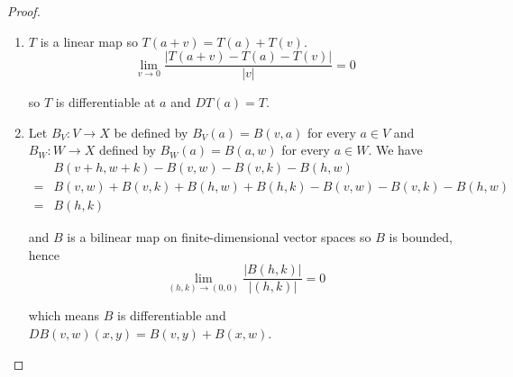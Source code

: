 \begin{proof}
\begin{enumerate}[itemsep=0pt,label={(\alph*)}]
              Since
              \begingroup
              \allowdisplaybreaks%
              \begin{align*}
                   & \lim\limits_{v \to 0} \dfrac{\left\vert R_{f}(v)/g(a + v) \right\vert}{\left\vert v \right\vert} = 0,                                                                      \\
                   & \lim\limits_{v \to 0} \dfrac{\left\vert \left(\dfrac{1}{g(a + v)} - \dfrac{1}{g(a)}\right) Df(a)v\right\vert}{\left\vert v \right\vert} = 0,                               \\
                   & \lim\limits_{v\to 0} \dfrac{\left\vert f(a)\left( \dfrac{R_{g}(v) - Dg(a)v}{g(a + v)g(a)} + \dfrac{Dg(a)}{{g(a)}^{2}}v \right) \right\vert}{\left\vert v \right\vert} = 0,
              \end{align*}
              \endgroup

              then according to the squeeze theorem
              \[
                  \lim\limits_{v \to 0} \dfrac{\left\vert \dfrac{f(a + v)}{g(a + v)} - \dfrac{f(a)}{g(a)} - \dfrac{g(a)Df(a) - f(a)Dg(a)}{{g(a)}^{2}} \right\vert}{\left\vert v \right\vert} = 0.
              \]

              Thus \( f/g \) is differentiable at \( a \) and \( D(f/g)(a) = \dfrac{g(a)Df(a) - f(a)Dg(a)}{{g(a)}^{2}} \).
        \item \( T \) is a linear map so \( T(a + v) = T(a) + T(v) \).
              \[
                  \lim\limits_{v \to 0}\dfrac{\left\vert T(a + v) - T(a) - T(v) \right\vert}{\left\vert v \right\vert} = 0
              \]

              so \( T \) is differentiable at \( a \) and \( DT(a) = T \).
        \item Let \( B_{V}: V \to X \) be defined by \( B_{V}(a) = B(v, a) \) for every \( a \in V \) and \( B_{W}: W \to X \) defined by \( B_{W}(a) = B(a, w) \) for every \( a \in W \). We have
              \begingroup
              \allowdisplaybreaks%
              \begin{align*}
                    & B(v + h, w + k) - B(v, w) - B(v, k) - B(h, w)                       \\
                  = & B(v, w) + B(v, k) + B(h, w) + B(h, k) - B(v, w) - B(v, k) - B(h, w) \\
                  = & B(h, k)
              \end{align*}
              \endgroup

              and \( B \) is a bilinear map on finite-dimensional vector spaces so \( B \) is bounded, hence
              \[
                  \lim\limits_{(h, k) \to (0, 0)} \dfrac{\left\vert B(h, k) \right\vert}{\left\vert (h, k) \right\vert} = 0
              \]

              which means \( B \) is differentiable and \( DB(v, w)(x, y) = B(v, y) + B(x, w) \).
    \end{enumerate}
\end{proof}

